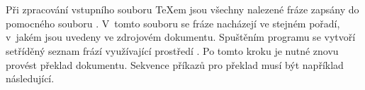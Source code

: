 \documentclass[12pt]{article}
\begin{document}
\begin{example}
   \\
   \\
\end{example}
\par\egroup

\medskip
Při zpracování vstupního souboru \TeX em jsou všechny nalezené fráze zapsány
do pomocného souboru . V~tomto souboru se fráze nacházejí
ve stejném pořadí, v~jakém jsou uvedeny ve zdrojovém dokumentu. Spuštěním
programu  se vytvoří setříděný seznam frází
 využívající prostředí .
Po tomto kroku je nutné znovu provést překlad dokumentu. 
Sekvence příkazů pro překlad musí být například následující.

\begin{flushleft}
   \\
   \\
   \\
   \\
\end{flushleft}
\end{document}

